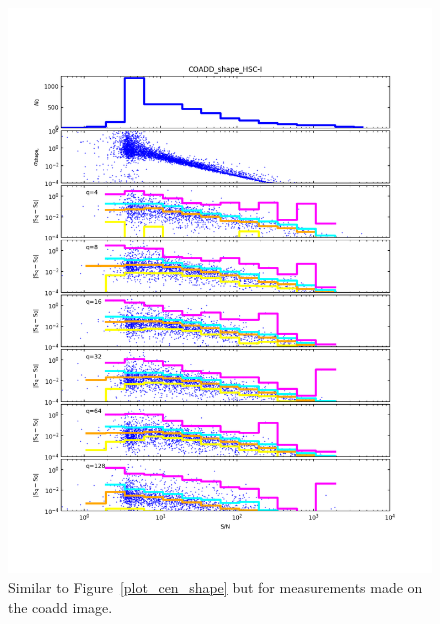 \begin{figure}[t]
\begin{minipage}{.49\textwidth}
        \includegraphics[width=1.0\textwidth]{figure/plot_coadd_shape_HSC-I.png}
    \end{minipage}
\caption{Similar to Figure~\ref{plot_cen_shape} but for measurements made on the coadd image.}
\label{plot_coadd_cen_shape}
\end{figure}


